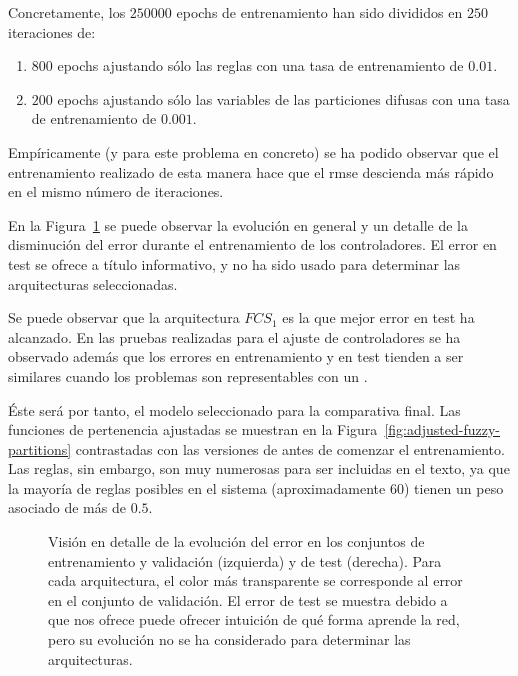Concretamente, los $250000$ epochs de entrenamiento han sido divididos en $250$ iteraciones de:

\begin{enumerate}
	\item $800$ epochs ajustando sólo las reglas con una tasa de entrenamiento de $0.01$.
	\item $200$ epochs ajustando sólo las variables de las particiones difusas con una tasa de entrenamiento de $0.001$.
\end{enumerate}

Empíricamente (y para este problema en concreto) se ha podido observar que el entrenamiento realizado de esta manera hace que el \ac{rmse} descienda más rápido en el mismo número de iteraciones.

En la Figura~\ref{fig:lm-fcs-rmse-all-comparisons} se puede observar la evolución en general y un detalle de la disminución del error durante el entrenamiento de los controladores. El error en test se ofrece a título informativo, y no ha sido usado para determinar las arquitecturas seleccionadas.

Se puede observar que la arquitectura $FCS_1$ es la que mejor error en test ha alcanzado. En las pruebas realizadas para el ajuste de controladores se ha observado además que los errores en entrenamiento y en test tienden a ser similares cuando los problemas son representables con un .

Éste será por tanto, el modelo seleccionado para la comparativa final. Las funciones de pertenencia ajustadas se muestran en la Figura~\ref{fig:adjusted-fuzzy-partitions} contrastadas con las versiones de antes de comenzar el entrenamiento. Las reglas, sin embargo, son muy numerosas para ser incluidas en el texto, ya que la mayoría de reglas posibles en el sistema (aproximadamente $60$) tienen un peso asociado de más de $0.5$.

\begin{figure}[t]
	\centering
	\qquad
	\caption[Evolución del error durante el entrenamiento en las arquitecturas de \acrshort{fcs} para el modelo longitudinal]{Visión en detalle de la evolución del error en los conjuntos de entrenamiento y validación (izquierda) y de test (derecha). Para cada arquitectura, el color más transparente se corresponde al error en el conjunto de validación. El error de test se muestra debido a que nos ofrece puede ofrecer intuición de qué forma aprende la red, pero su evolución no se ha considerado para determinar las arquitecturas.}
	\label{fig:lm-fcs-rmse-all-comparisons}
\end{figure}

